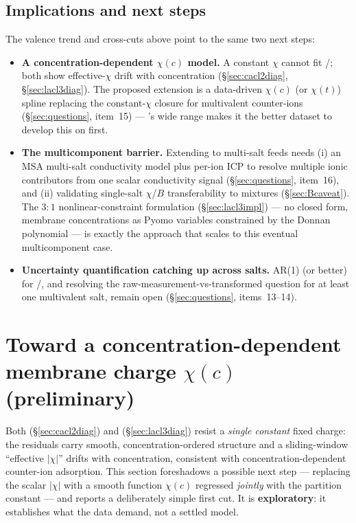 \documentclass[11pt]{article}
\begin{document}
\subsection{Implications and next steps}\label{sec:synthesisnext}
The valence trend and cross-cuts above point to the same two next steps:
\begin{itemize}[itemsep=2pt]
  \item \textbf{A concentration-dependent $\chi(c)$ model.} A constant $\chi$
        cannot fit /; both show effective-$\chi$ drift
        with concentration (\S\ref{sec:cacl2diag}, \S\ref{sec:lacl3diag}).
        The proposed extension is a data-driven $\chi(c)$ (or $\chi(t)$)
        spline replacing the constant-$\chi$ closure for multivalent
        counter-ions (\S\ref{sec:questions}, item~15) --- 's wide
        range makes it the better dataset to develop this on first.
  \item \textbf{The multicomponent barrier.} Extending to multi-salt feeds
        needs (i) an MSA multi-salt conductivity model plus per-ion ICP to
        resolve multiple ionic contributors from one scalar conductivity
        signal (\S\ref{sec:questions}, item~16), and (ii) validating
        single-salt $\chi$/$B$ transferability to mixtures
        (\S\ref{sec:Bcaveat}). The $3{:}1$ nonlinear-constraint formulation
        (\S\ref{sec:lacl3impl}) --- no closed form, membrane concentrations
        as Pyomo variables constrained by the Donnan polynomial --- is
        exactly the approach that scales to this eventual multicomponent case.
  \item \textbf{Uncertainty quantification catching up across salts.} AR(1)
        (or better) for /, and resolving the
        raw-measurement-vs-transformed question for at least one multivalent
        salt, remain open (\S\ref{sec:questions}, items~13--14).
\end{itemize}

\section{Toward a concentration-dependent membrane charge $\chi(c)$ (preliminary)}\label{sec:chispline}
Both  (\S\ref{sec:cacl2diag}) and  (\S\ref{sec:lacl3diag})
resist a \emph{single constant} fixed charge: the residuals carry smooth,
concentration-ordered structure and a sliding-window ``effective $|\chi|$''
drifts with concentration, consistent with concentration-dependent counter-ion
adsorption. This section foreshadows a possible next step --- replacing the
scalar $|\chi|$ with a smooth function $\chi(c)$ regressed \emph{jointly} with
the partition constant --- and reports a deliberately simple first cut. It is
\textbf{exploratory}: it establishes what the data demand, not a settled model.
\end{document}
